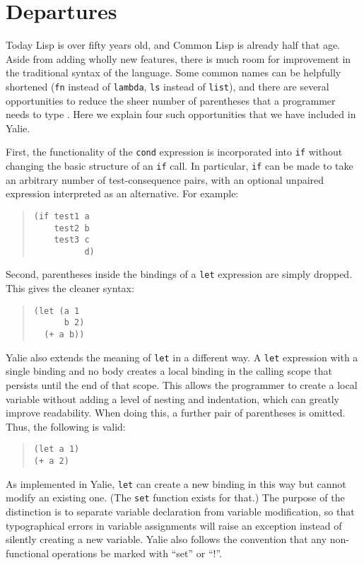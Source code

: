 \documentclass[twocolumn]{article}
\begin{document}
\section*{Departures}
Today Lisp is over fifty years old, and Common Lisp is already half
that age. Aside from adding wholly new features, there is much room
for improvement in the traditional syntax of the language. Some common
names can be helpfully shortened (\texttt{fn} instead of
\texttt{lambda}, \texttt{ls} instead of \texttt{list}), and there are
several opportunities to reduce the sheer number of parentheses that a
programmer needs to type \cite{Graham}. Here we explain four such
opportunities that we have included in Yalie.

First, the functionality of the \texttt{cond} expression is
incorporated into \texttt{if} without changing the basic structure of
an \texttt{if} call. In particular, \texttt{if} can be made to take an
arbitrary number of test-consequence pairs, with an optional unpaired
expression interpreted as an alternative. For example:
\begin{quote}
\begin{verbatim}
(if test1 a
    test2 b
    test3 c
          d)
\end{verbatim}
\end{quote}

Second, parentheses inside the bindings of a \texttt{let} expression
are simply dropped. This gives the cleaner syntax:
\begin{quote}
\begin{verbatim}
(let (a 1
      b 2)
  (+ a b))
\end{verbatim}
\end{quote}
Yalie also extends the meaning of \texttt{let} in a different way. A
\texttt{let} expression with a single binding and no body creates a
local binding in the calling scope that persists until the end of that
scope. This allows the programmer to create a local variable without
adding a level of nesting and indentation, which can greatly improve
readability. When doing this, a further pair of parentheses is
omitted. Thus, the following is valid:
\begin{quote}
\begin{verbatim}
(let a 1)
(+ a 2)
\end{verbatim}
\end{quote}
As implemented in Yalie, \texttt{let} can create a new binding in this
way but cannot modify an existing one. (The \texttt{set} function
exists for that.) The purpose of the distinction is to separate
variable declaration from variable modification, so that typographical
errors in variable assignments will raise an exception instead of
silently creating a new variable. Yalie also follows the convention
that any non-functional operations be marked with ``set'' or ``!''.
\end{document}

